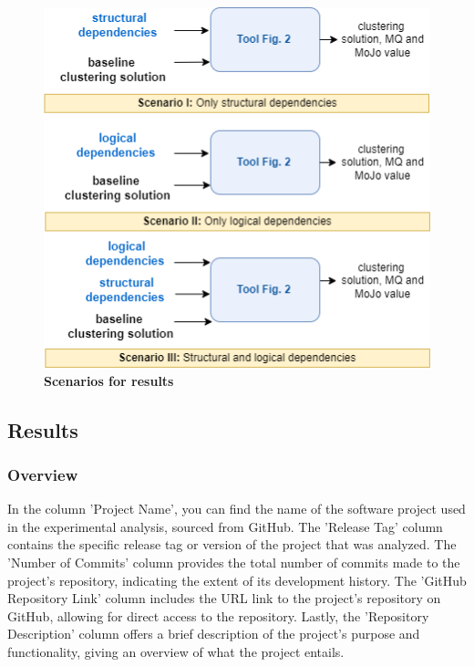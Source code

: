 \documentclass{ieeeaccess}
\begin{document}
\begin{figure}[t!]
  \centering
  \includegraphics[width=\columnwidth]{scenario.png}
  \caption{ \textbf{Scenarios for results}}
  \label{fig:scenatrio}
\end{figure}


\subsection{Results}
\label{subsec:results}

\subsubsection{Overview}

In the column 'Project Name', you can find the name of the software project used in the experimental analysis, sourced from GitHub. The 'Release Tag' column contains the specific release tag or version of the project that was analyzed. The 'Number of Commits' column provides the total number of commits made to the project's repository, indicating the extent of its development history. The 'GitHub Repository Link' column includes the URL link to the project's repository on GitHub, allowing for direct access to the repository. Lastly, the 'Repository Description' column offers a brief description of the project's purpose and functionality, giving an overview of what the project entails.
\end{document}
